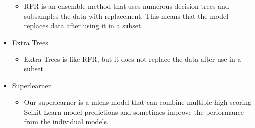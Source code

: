 \documentclass[twocolumn, nofootinbib, secnumarabic, amssymb, nobibnotes, aps, prd]{revtex4-2}
\begin{document}
\begin{itemize}
  \begin{itemize}
  		\item RFR is an ensemble method that uses numerous decision trees and subsamples the data with replacement. This means that the model replaces data after using it in a subset.
  \end{itemize}
  \item Extra Trees
  \begin{itemize}
  		\item Extra Trees is like RFR, but it does not replace the data after use in a subset.
  \end{itemize}
  \item Superlearner
  \begin{itemize}
  		\item Our superlearner is a mlens model that can combine multiple high-scoring Scikit-Learn model predictions and sometimes improve the performance from the individual models.
  \end{itemize}
\end{itemize}\label{itm:models}



\end{document}
